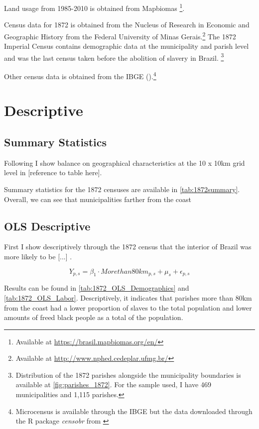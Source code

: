 \documentclass{article}
\begin{document}
Land usage from 1985-2010 is obtained from Mapbiomas \parencite{Souza2020-kb}\footnote{
  Available at \url{https://brasil.mapbiomas.org/en/}}.

Census data for 1872 is obtained from the Nucleus of Research in Economic and Geographic History from the Federal University of Minas Gerais.\footnote{
  Available at \url{http://www.nphed.cedeplar.ufmg.br/}}
The 1872 Imperial Census contains demographic data at the municipality and parish level and was the last census taken before the abolition of slavery in Brazil. \footnote{Distribution of the 1872 parishes alongside the municipality boundaries is available at \autoref{fig:parishes_1872}. For the sample used, I have 469 municipalities and 1,115 parishes.}

Other census data is obtained from the IBGE (\textit{}).\footnote{Microcensus is available through the IBGE but the data downloaded through the R package \textit{censobr} from \textcite{Pereira2023-qv}}

\section{Descriptive}

\subsection{Summary Statistics}

Following \textcite{Lowes2021-ww} I show balance on geographical characteristics at the 10 x 10km grid level in [reference to table here].

Summary statistics for the 1872 censuses are available in \autoref{tab:1872summary}. Overall, we can see that municipalities farther from the coast 

\subsection{OLS Descriptive}

First I show descriptively through the 1872 census that the interior of Brazil was more likely to be [...] \parencite{Laudares2022-vy}.

\begin{equation}
  Y_{p,s} = \beta_1 \cdot Morethan80km_{p,s} + \mu_s + \epsilon_{p,s}
\end{equation}

Results can be found in \autoref{tab:1872_OLS_Demographics} and \autoref{tab:1872_OLS_Labor}. Descriptively, it indicates that parishes more than 80km from the coast had a lower proportion of slaves to the total population and lower amounts of freed black people as a total of the population.
\end{document}
